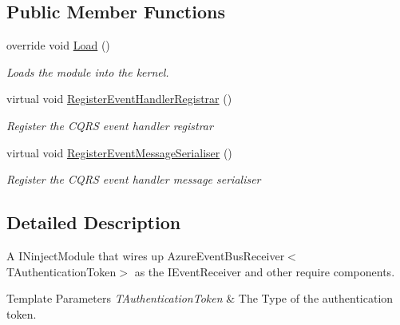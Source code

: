 \subsection*{Public Member Functions}
\begin{DoxyCompactItemize}
\item 
override void \hyperlink{classCqrs_1_1Azure_1_1EventHub_1_1EventBus_1_1Configuration_1_1AzureEventHubReceiverModule_a2da94c97ebabdf7645a558ccf21f5de2_a2da94c97ebabdf7645a558ccf21f5de2}{Load} ()
\begin{DoxyCompactList}\small\item\em Loads the module into the kernel. \end{DoxyCompactList}\item 
virtual void \hyperlink{classCqrs_1_1Azure_1_1EventHub_1_1EventBus_1_1Configuration_1_1AzureEventHubReceiverModule_a9d74898d26c20b26e5368b0edf2d4a04_a9d74898d26c20b26e5368b0edf2d4a04}{Register\+Event\+Handler\+Registrar} ()
\begin{DoxyCompactList}\small\item\em Register the C\+Q\+RS event handler registrar \end{DoxyCompactList}\item 
virtual void \hyperlink{classCqrs_1_1Azure_1_1EventHub_1_1EventBus_1_1Configuration_1_1AzureEventHubReceiverModule_a7164b8ca5e4e768d46659cff6289156a_a7164b8ca5e4e768d46659cff6289156a}{Register\+Event\+Message\+Serialiser} ()
\begin{DoxyCompactList}\small\item\em Register the C\+Q\+RS event handler message serialiser \end{DoxyCompactList}\end{DoxyCompactItemize}


\subsection{Detailed Description}
A I\+Ninject\+Module that wires up Azure\+Event\+Bus\+Receiver$<$\+T\+Authentication\+Token$>$ as the I\+Event\+Receiver and other require components. 


\begin{DoxyTemplParams}{Template Parameters}
{\em T\+Authentication\+Token} & The Type of the authentication token.\\
\hline
\end{DoxyTemplParams}


